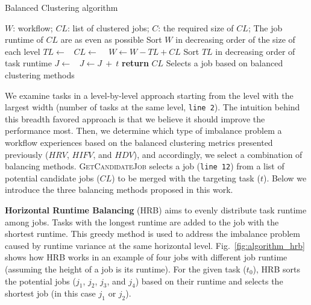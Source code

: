 \documentclass[final,5p,times,twocolumn]{elsarticle}
\begin{document}
\begin{algorithm}[htb]
	\caption{ Balanced Clustering algorithm}
	\footnotesize
	\label{alg:admit}
	\begin{algorithmic}[1]
		\Require $W$: workflow; $CL$: list of clustered jobs; $C$: the required size of $CL$; 
		\Ensure The job runtime of $CL$ are as even as possible
			\State Sort $W$ in decreasing order of the size of each level
				\State $TL\gets $\  
				\State $CL\gets$  \  
				\State $W \gets W - TL + CL$   
			\EndFor
		\EndProcedure
			\State Sort $TL$ in decreasing order of task runtime
				\State $J \gets $\  
				\State  $J \gets J\ +\ t$ 
			\EndFor
			\State \textbf{return} $CL$
		\EndProcedure
			\State Selects a job based on balanced clustering methods
		\EndProcedure
	\end{algorithmic}
\end{algorithm}

We examine tasks in a level-by-level approach starting from the level with the largest width (number of tasks at the same level, \texttt{line 2}). The intuition behind this breadth favored approach is that we believe it should improve the performance most. Then, we determine which type of imbalance problem a workflow experiences based on the balanced clustering metrics presented previously ($HRV$, $HIFV$, and $HDV$), and accordingly, we select a combination of balancing methods. \textsc{GetCandidateJob} selects a job (\texttt{line 12}) from a list of potential candidate jobs ($CL$) to be merged with the targeting task ($t$). Below we introduce the three balancing methods proposed in this work.

\textbf{Horizontal Runtime Balancing} (HRB) aims to evenly distribute task runtime among jobs. Tasks with the longest runtime are added to the job with the shortest runtime. This greedy method is used to address the imbalance problem caused by runtime variance at the same horizontal level. Fig.~\ref{fig:algorithm_hrb} shows how HRB works in an example of four jobs with different job runtime (assuming the height of a job is its runtime). For the given task ($t_0$), HRB sorts the potential jobs ($j_1$, $j_2$, $j_3$, and $j_4$) based on their runtime and selects the shortest job (in this case $j_1$ or $j_2$). 
\end{document}

